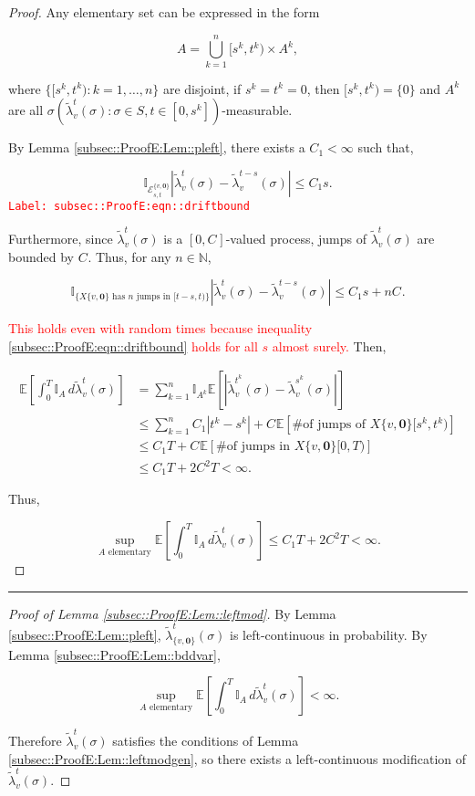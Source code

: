 \documentclass[12pt]{article}
\newcommand{\mb}{\mathbb}
\newcommand{\mc}{\mathcal}
\newcommand{\te}{\text}
\newcommand{\tr}{\textcolor{red}}
\newcommand{\labe}[1]{\tr{\texttt{Label: #1}}}
\newcommand{\lin}{\rule{\linewidth}{0.4 pt}}
\newcommand{\ex}[1]{\mb{E}\left[#1\right]}			%
\renewcommand{\root}{\mathbf{0}}				%
\renewcommand{\v}{v}							%
\renewcommand{\S}{S}							%
\newcommand{\s}{\sigma}							%
\newcommand{\T}{T}								%
\renewcommand{\t}{t}							%
\renewcommand{\tt}{s}							%
\newcommand{\X}{X}								%
\newcommand{\pup}[1]{^{#1}}							%
\renewcommand{\it}{k}								%
\newcommand{\numb}{n}								%
\newcommand{\crate}[2]{\alt{\lambda}_{#1}^{#2}}		%
\newcommand{\const}[1]{C_{#1}}						%
\newcommand{\alt}{\widetilde}						%
\newcommand{\evnt}{\mc{E}}						%
\newcommand{\typset}{A}							%
\begin{document}
\begin{proof}
Any elementary set can be expressed in the form

\[\typset = \bigcup_{\it = 1}^\numb [\tt^\it,\t^\it)\times \typset\pup{\it},\]

where \(\{[\tt^\it,\t^\it):\it=1,\dots,\numb\}\) are disjoint, if \(\tt^\it = \t^\it = 0\), then \([\tt^\it,\t^\it) = \{0\}\) and \(\typset\pup{\it}\) are all \(\sigma(\crate{\v}{\t}(\s):\s \in \S,\t\in [0,\tt^\it])\)-measurable. 

By Lemma \ref{subsec::ProofE:Lem::pleft}, there exists a \(\const{1} < \infty\) such that,

\begin{equation}
\mb{I}_{\evnt^{\{\v,\root\}}_{\tt,\t}}|\crate{\v}{\t}(\s) - \crate{\v}{\t-\tt}(\s)| \leq \const{1}\tt.
\label{subsec::ProofE:eqn::driftbound}
\end{equation}
\labe{subsec::ProofE:eqn::driftbound}

Furthermore, since \(\crate{\v}{\t}(\s)\) is a \([0,\const{}]\)-valued process, jumps of \(\crate{\v}{\t}(\s)\) are bounded by \(\const{}\). Thus, for any \(\numb \in \mb{N}\),

\[\mb{I}_{\{\X{\{\v,\root\}}{}\te{ has }\numb\te{ jumps in } [\t-\tt,\t)\}}|\crate{\v}{\t}(\s) - \crate{\v}{\t-\tt}(\s)|\leq C_1\tt + \numb \const{}.\]

\tr{This holds even with random times because inequality \eqref{subsec::ProofE:eqn::driftbound} holds for all \(\tt\) almost surely.} Then,

\begin{align*}
\ex{\int_0^\T \mb{I}_\typset\,d\crate{\v}{\t}(\s)} &= \sum_{\it = 1}^\numb \mb{I}_{\typset^\it}\ex{\left|\crate{\v}{\t^k}(\s) - \crate{\v}{\tt^k}(\s)\right|}\\
&\leq \sum_{\it=1}^\numb \const{1}|\t^\it - \tt^\it| + \const{}\ex{\te{\# of jumps of }\X{\{\v,\root\}}{[\tt^\it,\t^\it)}}\\
&\leq \const{1}\T + \const{}\ex{\te{\# of jumps in }\X{\{\v,\root\}}{[0,\T)}}\\
&\leq \const{1}\T + 2\const{}^2\T < \infty.
\end{align*}

Thus,

\[\sup_{\typset\te{ elementary}} \ex{\int_0^\T \mb{I}_\typset\,d\crate{\v}{\t}(\s)} \leq \const{1}\T + 2\const{}^2\T < \infty.\]
\end{proof}

\lin

\begin{proof}[Proof of Lemma \ref{subsec::ProofE:Lem::leftmod}]

By Lemma \ref{subsec::ProofE:Lem::pleft}, \(\crate{\{\v,\root\}}{\t}(\s)\) is left-continuous in probability. By Lemma \ref{subsec::ProofE:Lem::bddvar},

\[\sup_{\typset\te{ elementary}} \ex{\int_0^\T \mb{I}_{\typset}\,d\crate{\v}{\t}(\s)} < \infty.\]

Therefore \(\crate{\v}{\t}(\s)\) satisfies the conditions of Lemma \ref{subsec::ProofE:Lem::leftmodgen}, so there exists a left-continuous modification of \(\crate{\v}{\t}(\s)\).
\end{proof}
\end{document}
